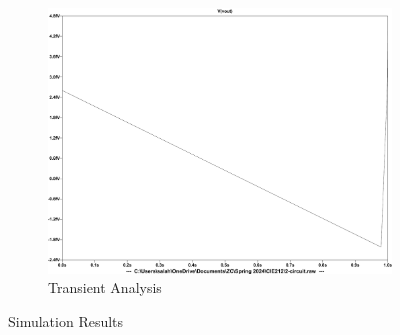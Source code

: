 \documentclass{zc-ust-hw}
\begin{document}
\begin{enumerate}
\begin{figure}[H]
\begin{subfigure}{0.45\textwidth}
        \centering
        \includegraphics[width=\textwidth]{figures/2-transient.pdf}
        \caption{Transient Analysis}
      \end{subfigure}
      \caption{Simulation Results}
    \end{figure}

    \newpage


\end{enumerate}
\end{document}
